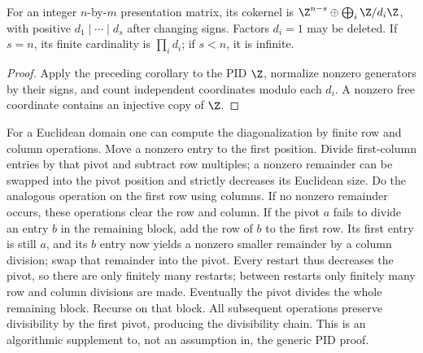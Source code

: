 \begin{corollary}\label{cor:integer-presentation-cokernel}
For an integer $n$-by-$m$ presentation matrix, its cokernel is
$\Z^{n-s}\oplus\bigoplus_i\Z/d_i\Z$, with positive
$d_1\mid\cdots\mid d_s$ after changing signs. Factors $d_i=1$ may
be deleted. If $s=n$, its finite cardinality is $\prod_i d_i$;
if $s<n$, it is infinite.
\end{corollary}
\begin{proof}
Apply the preceding corollary to the PID $\Z$, normalize nonzero
generators by their signs, and count independent coordinates modulo each
$d_i$. A nonzero free coordinate contains an injective copy of $\Z$.
\end{proof}

For a Euclidean domain one can compute the diagonalization by finite
row and column operations. Move a nonzero entry to the first position.
Divide first-column entries by that pivot and subtract row multiples;
a nonzero remainder can be swapped into the pivot position and strictly
decreases its Euclidean size. Do the analogous operation on the first
row using columns. If no nonzero remainder occurs, these operations
clear the row and column. If the pivot $a$ fails to divide an entry $b$
in the remaining block, add the row of $b$ to the first row. Its first
entry is still $a$, and its $b$ entry now yields a nonzero smaller
remainder by a column division; swap that remainder into the pivot.
Every restart thus decreases the pivot, so there are only finitely many
restarts; between restarts only finitely many row and column divisions
are made. Eventually the pivot divides the whole remaining block.
Recurse on that block. All subsequent operations preserve divisibility
by the first pivot, producing the divisibility chain. This is an
algorithmic supplement to, not an assumption in, the generic PID proof.

